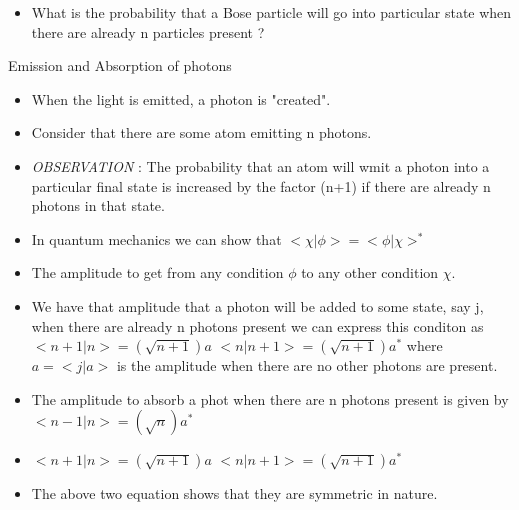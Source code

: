 \documentclass[aspectratio=169]{beamer}
\begin{document}
\begin{frame}
	\begin{itemize}
		\item What is the probability that a Bose particle will go into particular state when there are already n particles present ?
	\end{itemize}
\end{frame}

\begin{frame}{Emission and Absorption of photons}
	\begin{itemize}
		\item When the light is emitted, a photon is "created".\newline
		\item Consider that there are some atom emitting n photons. \newline
		\item \textit{OBSERVATION} : The probability that an atom will wmit a photon into a particular final state is increased by the factor (n+1) if there are already n photons in that state.
	\end{itemize}
\end{frame}

\begin{frame}
	\begin{itemize}
		\item In quantum mechanics we can show that \newline 
		$<\chi|\phi> = <\phi|\chi>^{*}$ \newline
		\item The amplitude to get from any condition $\phi$ to any other condition $\chi$. \newline
		\item We have that amplitude that a photon will be added to some state, say j, when there are already n photons present we can express this conditon as \newline
		$<n+1|n>=(\sqrt{n+1})a$\newline
		$<n|n+1>=\left(\sqrt{n+1}\right)a^{*}$ \newline
		where $a = <j|a>$ is the amplitude when there are no other photons are present.
	
	\end{itemize}
\end{frame}

\begin{frame}
	\begin{itemize}
		\item The amplitude to absorb a phot when there are n photons present is given by \newline
		$<n-1|n> = (\sqrt{n})a^{*}$ \newline
		\item  $<n+1|n>=(\sqrt{n+1})a$\newline
		$<n|n+1>=\left(\sqrt{n+1}\right)a^{*}$ \newline
		\item The above two equation shows that they are symmetric in nature.
	\end{itemize}
\end{frame}
\end{document}
